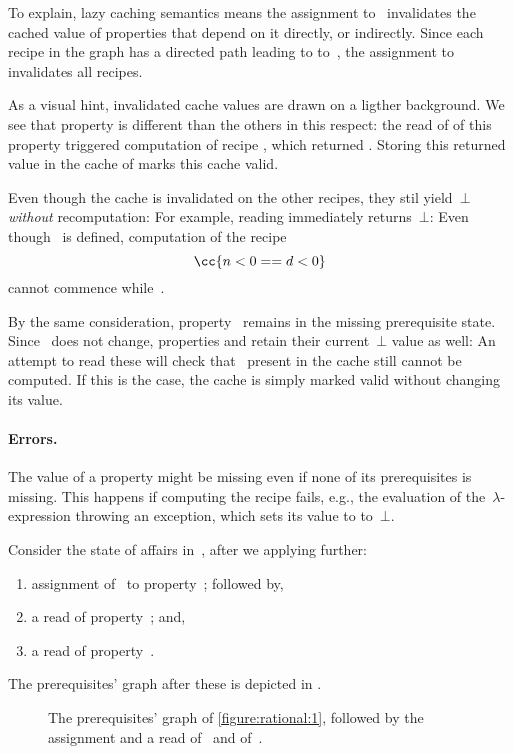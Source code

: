 To explain, lazy caching semantics means the assignment to~ invalidates
the cached value of properties that depend on it directly,
or indirectly. Since each recipe in the graph has a directed path
leading to to~, the assignment to~ invalidates all recipes.

As a visual hint, invalidated cache values are drawn on a ligther background.
We see that property  is different than the others in this
respect: the read of of this property triggered computation of recipe
, which returned . Storing this returned value in the cache
of  marks this cache valid.

Even though the cache is invalidated on the other recipes, they stil
yield~$⊥$ \emph{without} recomputation: For example, reading
 immediately returns~$⊥$: Even though~ is defined,
computation of the recipe \[
  \cc{n < 0 == d < 0}
\] cannot commence
while~.

By the same consideration, property~ remains in the missing
prerequisite state. Since~ does not change, properties 
and  retain their current~$⊥$ value as well: An attempt to
read these will check that~ present in the cache still cannot
be computed. If this is the case, the cache is simply marked valid
without changing its value.

\paragraph{Errors.}
The value of a property might be missing even if none of its prerequisites is
missing. This happens if computing the recipe fails, e.g., the \Java
evaluation of the~$λ$-expression throwing an exception, which sets its value
to to~$⊥$.

Consider the state of affairs in~, after we applying further:
\begin{enumerate}
  \item assignment of~ to property~; followed by,
  \item a read of property~; and,
  \item a read of property~.
\end{enumerate}

The prerequisites' graph after these is depicted in .

\begin{figure}[H]
  \caption{\label{figure:rational:2}%
    The prerequisites' graph of \cref{figure:rational:1},
    followed by the assignment  and a read
    of~ and of~.
  }
  \begin{adjustbox}{max width=\columnwidth}
    
  \end{adjustbox}
\end{figure}

